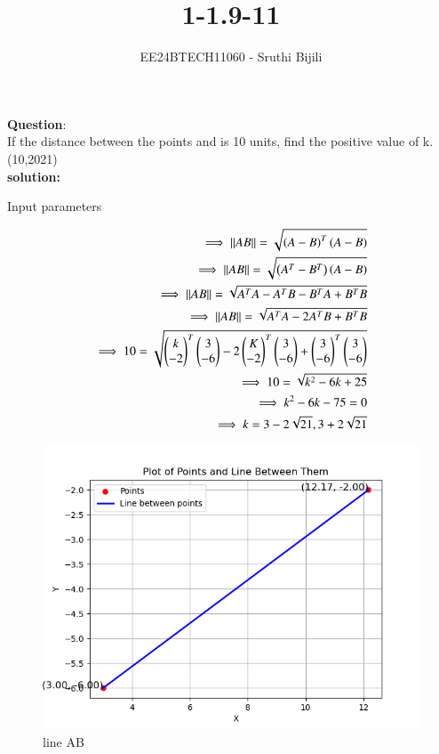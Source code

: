 \documentclass[journal]{IEEEtran}
\begin{document}

\vspace{3cm}

\title{1-1.9-11}
\author{EE24BTECH11060 - Sruthi Bijili}
{\let\newpage\relax\maketitle}

\renewcommand{\thefigure}{\theenumi}
\renewcommand{\thetable}{\theenumi}
\setlength{\intextsep}{10pt} %


\renewcommand{\thetable}{\theenumi}

\textbf{Question}:\\
If the distance between the points  and  is 10 units, find the positive
value of k.
\hfill(10,2021)\\
\textbf{solution:}
\begin{table}[h!]    
  \centering
  
  \caption{Input parameters}
\end{table}
\begin{align}
   \implies \left\vert\left\vert AB\right\vert\right\vert=\sqrt{\left(A-B\right)^T\left(A-B\right)}\\
   \implies \left\vert\left\vert AB\right\vert\right\vert=\sqrt{\left(A^T-B^T\right)\left(A-B\right)}\\
   \implies \left\vert\left\vert AB\right\vert\right\vert=\sqrt{A^TA-A^TB-B^TA+B^TB}\\
   \implies \left\vert\left\vert AB\right\vert\right\vert=\sqrt{A^TA-2A^TB+B^TB}\\
   \implies 10 =\sqrt{\begin{pmatrix}k \\ -2\end{pmatrix}^T\begin{pmatrix}3 \\-6\end{pmatrix}-2\begin{pmatrix}K \\-2\end{pmatrix}^T\begin{pmatrix}3\\-6\end{pmatrix}+\begin{pmatrix}3\\-6\end{pmatrix}^T\begin{pmatrix}3\\-6\end{pmatrix}}\\
   \implies 10 =\sqrt{k^2-6k+25}\\
   \implies k^2-6k-75=0\\
   \implies k=3-2\sqrt{21},3+2\sqrt{21}
\end{align}
\begin{figure}[h!]
   \centering
   \includegraphics[width=0.7\linewidth]{figs/fig1.png}
   \caption{line AB}
\end{figure}
\end{document}
